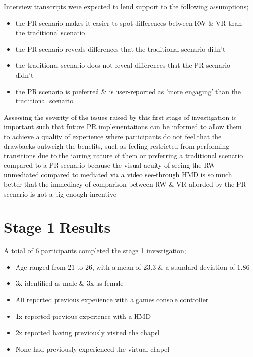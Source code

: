 Interview transcripts were expected to lend support to the following assumptions;
\begin{itemize}
	\item the PR scenario makes it easier to spot differences between RW \& VR than the traditional scenario
	\item the PR scenario reveals differences that the traditional scenario didn't
	\item the traditional scenario does not reveal differences that the PR scenario didn't
	\item the PR scenario is preferred \& is user-reported as 'more engaging' than the traditional scenario
\end{itemize}

Assessing the severity of the issues raised by this first stage of investigation is important such that future PR implementations can be informed to allow them to achieve a quality of experience where participants do not feel that the drawbacks outweigh the benefits, such as feeling restricted from performing transitions due to the jarring nature of them or preferring a traditional scenario compared to a PR scenario because the visual acuity of seeing the RW unmediated compared to mediated via a video see-through HMD is so much better that the immediacy of comparison between RW \& VR afforded by the PR scenario is not a big enough incentive.


\section{Stage 1 Results}

A total of 6 participants completed the stage 1 investigation;
\begin{itemize}
	\item Age ranged from 21 to 26, with a mean of 23.3 \& a standard deviation of 1.86
	\item 3x identified as male \& 3x as female
	\item All reported previous experience with a games console controller
	\item 1x reported previous experience with a HMD
	\item 2x reported having previously visited the chapel
	\item None had previously experienced the virtual chapel
\end{itemize}

